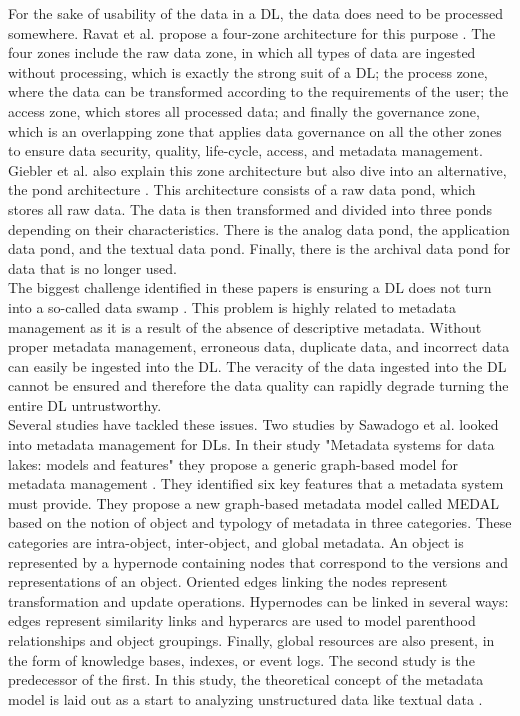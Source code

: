 \documentclass[11pt]{article}
\begin{document}
For the sake of usability of the data in a DL, the data does need to be processed somewhere. Ravat et al. propose a four-zone architecture for this purpose \cite{Ravat2019304}. The four zones include the raw data zone, in which all types of data are ingested without processing, which is exactly the strong suit of a DL; the process zone, where the data can be transformed according to the requirements of the user; the access zone, which stores all processed data; and finally the governance zone, which is an overlapping zone that applies data governance on all the other zones to ensure data security, quality, life-cycle, access, and metadata management. \\

Giebler et al. also explain this zone architecture but also dive into an alternative, the pond architecture \cite{Giebler2019179}. This architecture consists of a raw data pond, which stores all raw data. The data is then transformed and divided into three ponds depending on their characteristics. There is the analog data pond, the application data pond, and the textual data pond. Finally, there is the archival data pond for data that is no longer used. \\

The biggest challenge identified in these papers is ensuring a DL does not turn into a so-called data swamp \cite{Giebler2019179}. This problem is highly related to metadata management as it is a result of the absence of descriptive metadata. Without proper metadata management, erroneous data, duplicate data, and incorrect data can easily be ingested into the DL. The veracity of the data ingested into the DL cannot be ensured and therefore the data quality can rapidly degrade turning the entire DL untrustworthy. \\

Several studies have tackled these issues. Two studies by Sawadogo et al. looked into metadata management for DLs. In their study "Metadata systems for data lakes: models and features" they propose a generic graph-based model for metadata management \cite{Sawadogo2019440}. They identified six key features that a metadata system must provide. They propose a new graph-based metadata model called MEDAL based on the notion of object and typology of metadata in three categories. These categories are intra-object, inter-object, and global metadata. An object is represented by a hypernode containing nodes that correspond to the versions and representations of an object. Oriented edges linking the nodes represent transformation and update operations. Hypernodes can be linked in several ways: edges represent similarity links and hyperarcs are used to model parenthood relationships and object groupings. Finally, global resources are also present, in the form of knowledge bases, indexes, or event logs. The second study is the predecessor of the first. In this study, the theoretical concept of the metadata model is laid out as a start to analyzing unstructured data like textual data \cite{Sawadogo2019558}. \\
\end{document}
